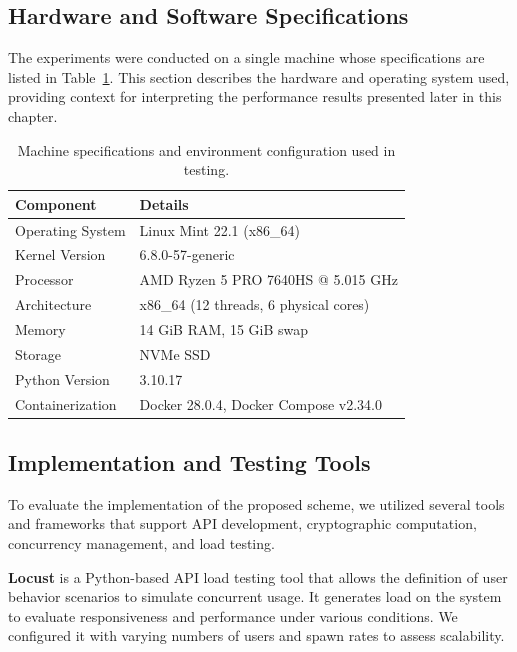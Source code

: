 \documentclass[cic,tc,english]{iiufrgs}
\numberwithin{algorithm}{chapter}
\begin{document}
        \subsection{Hardware and Software Specifications}
        \label{subsec:hardware-software}
            The experiments were conducted on a single machine whose specifications are listed in Table~\ref{tab:machine_specs}. This section describes the hardware and operating system used, providing context for interpreting the performance results presented later in this chapter.

            \begin{table}[h]
                \centering
                \begin{tabular}{|l|l|}
                \hline
                \textbf{Component} & \textbf{Details} \\ \hline
                Operating System & Linux Mint 22.1 (x86\_64) \\ \hline
                Kernel Version & 6.8.0-57-generic \\ \hline
                Processor & AMD Ryzen 5 PRO 7640HS @ 5.015 GHz \\ \hline
                Architecture & x86\_64 (12 threads, 6 physical cores) \\ \hline
                Memory & 14 GiB RAM, 15 GiB swap \\ \hline
                Storage & NVMe SSD \\ \hline
                Python Version & 3.10.17 \\ \hline
                Containerization & Docker 28.0.4, Docker Compose v2.34.0 \\ \hline
                \end{tabular}
                \caption{Machine specifications and environment configuration used in testing.}
                \label{tab:machine_specs}
            \end{table}

        \subsection{Implementation and Testing Tools}
        \label{subsec:tools}

            To evaluate the implementation of the proposed scheme, we utilized several tools and frameworks that support API development, cryptographic computation, concurrency management, and load testing.

            \textbf{Locust} is a Python-based API load testing tool that allows the definition of user behavior scenarios to simulate concurrent usage. It generates load on the system to evaluate responsiveness and performance under various conditions. We configured it with varying numbers of users and spawn rates to assess scalability.
\end{document}
